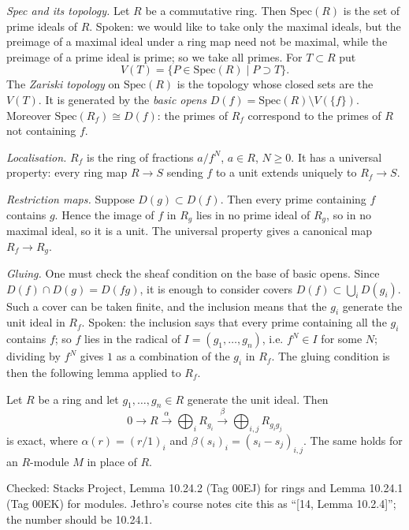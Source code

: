 \textit{Spec and its topology.} Let $R$ be a
commutative ring. Then $\mathrm{Spec}(R)$ is
the set of prime ideals of $R$. Spoken: we
would like to take only the maximal ideals,
but the preimage of a maximal ideal under a
ring map need not be maximal, while the
preimage of a prime ideal is prime; so we
take all primes. For $T\subset R$ put
$$
V(T)=\{P\in\mathrm{Spec}(R)\mid P\supset T\}.
$$
The \textit{Zariski topology} on
$\mathrm{Spec}(R)$ is the topology whose
closed sets are the $V(T)$. It is generated
by the \textit{basic opens}
$D(f)=\mathrm{Spec}(R)\setminus V(\{f\})$.
Moreover $\mathrm{Spec}(R_f)\cong D(f)$: the
primes of $R_f$ correspond to the primes of
$R$ not containing $f$.

\textit{Localisation.} $R_f$ is the ring of
fractions $a/f^N$, $a\in R$, $N\geq 0$. It
has a universal property: every ring map
$R\to S$ sending $f$ to a unit extends
uniquely to $R_f\to S$.

\textit{Restriction maps.} Suppose
$D(g)\subset D(f)$. Then every prime
containing $f$ contains $g$. Hence the image
of $f$ in $R_g$ lies in no prime ideal of
$R_g$, so in no maximal ideal, so it is a
unit. The universal property gives a
canonical map $R_f\to R_g$.

\textit{Gluing.} One must check the sheaf
condition on the base of basic opens. Since
$D(f)\cap D(g)=D(fg)$, it is enough to
consider covers $D(f)\subset\bigcup_i
D(g_i)$. Such a cover can be taken finite,
and the inclusion means that the $g_i$
generate the unit ideal in $R_f$. Spoken: the
inclusion says that every prime containing
all the $g_i$ contains $f$; so $f$ lies in
the radical of $I=(g_1,\dots,g_n)$, i.e.
$f^N\in I$ for some $N$; dividing by $f^N$
gives $1$ as a combination of the $g_i$ in
$R_f$. The gluing condition is then the
following lemma applied to $R_f$.

\begin{lemma}
\label{lemma-jethro-2026-11-04-gluing}
Let $R$ be a ring and let $g_1,\dots,g_n\in
R$ generate the unit ideal. Then
$$
0\to R\xrightarrow{\alpha}\bigoplus_i R_{g_i}
\xrightarrow{\beta}\bigoplus_{i,j}R_{g_ig_j}
$$
is exact, where $\alpha(r)=(r/1)_i$ and
$\beta(s_i)_i=(s_i-s_j)_{i,j}$. The same
holds for an $R$-module $M$ in place of $R$.
\end{lemma}

Checked: Stacks Project, Lemma 10.24.2 (Tag
00EJ) for rings and Lemma 10.24.1 (Tag 00EK)
for modules. Jethro's course notes cite this
as ``[14, Lemma 10.2.4]''; the number should
be 10.24.1.

